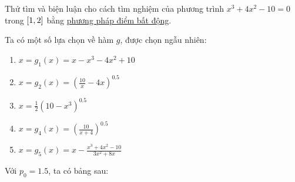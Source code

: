 \documentclass[../../Lectures.tex]{subfiles}
\begin{document}
\begin{exmp}
    Thử tìm và biện luận cho cách tìm nghiệm của phương trình \(x^3 + 4x^2 - 10
    = 0\) trong \(\interval{1}{2}\) bằng \hyperref[method:fixed_point]{phương
    pháp điểm bất động}.

    Ta có một số lựa chọn về hàm \(g\), được chọn ngẫu nhiên:

    \begin{multicols}{2}
        \begin{enumerate}[label = (\alph*)]
            \item \(x = g_1(x) = x - x^3 -4x^2 + 10\)
            \item \(x = g_2(x) = \left(\frac{10}{x} - 4x \right)^{0.5}\)
            \item \(x = \frac{1}{2} (10 - x^3)^{0.5}\)
            \item \(x = g_4(x) = \left(\frac{10}{x + 4} \right)^{0.5}\)
            \item \(x = g_5(x) = x - \frac{x^3 + 4x^2 - 10}{3x^2 + 8x}\)
        \end{enumerate}
    \end{multicols}

    Với \(p_0 = \num{1.5}\), ta có bảng sau:


\end{exmp}
\end{document}
